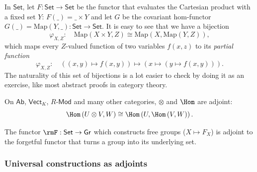 \begin{example}
In $\mathsf{Set}$, let $F:\mathsf{Set}\to\mathsf{Set}$ be the functor
that evaluates the Cartesian product with a fixed set $Y$: $F\left(\_\right)=\_\times Y$
and let $G$ be the covariant hom-functor $G\left(\_\right)=\mathrm{Map}\left(Y,\_\right):\mathsf{Set}\to\mathsf{Set}$.
It is easy to see that we have a bijection
\[
\varphi_{X,Z}:\quad\mathrm{Map}\left(X\times Y,Z\right)\cong\mathrm{Map}\left(X,\mathrm{Map}\left(Y,Z\right)\right),
\]
which maps every $Z$-valued function of two variables $f(x,z)$ to
its \emph{partial function}
\[
\varphi_{X,Z}:\quad\left(\left(x,y\right)\mapsto f(x,y)\right)\mapsto\left(x\mapsto\left(y\mapsto f\left(x,y\right)\right)\right).
\]
The naturality of this set of bijections is a lot easier to check
by doing it as an exercise, like most abstract proofs in category
theory.
\end{example}
%
\begin{example}\label{hom-functor adjoint}
On $\mathsf{Ab}$, $\mathsf{Vect}_{K}$, $R\text{-}\mathsf{Mod}$
and many other categories, $\otimes$ and $\Hom$ are adjoint:
\[
\Hom\left(U\otimes V,W\right)\cong\Hom\left(U,\Hom\left(V,W\right)\right).
\]
\end{example}
%
\begin{example}
The functor $\rmF:\mathsf{Set}\to \mathsf{Gr}$ which constructs free groups ($X\mapsto F_X$) is adjoint to the forgetful functor that turns a group into its underlying set.
\end{example}




\subsubsection{Universal constructions as adjoints}

